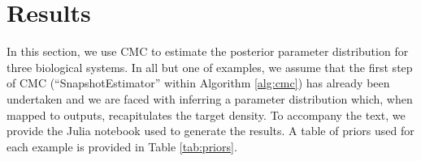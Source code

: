 \section{Results}\label{sec:results}
In this section, we use CMC to estimate the posterior parameter distribution for three biological systems.
In all but one of examples, we assume that the first step of CMC (``SnapshotEstimator'' within Algorithm \ref{alg:cmc}) has already been undertaken and we are faced with inferring a parameter distribution which, when mapped to outputs, recapitulates the target density. To accompany the text, we provide the Julia notebook used to generate the results. %
A table of priors used for each example is provided in Table \ref{tab:priors}.


